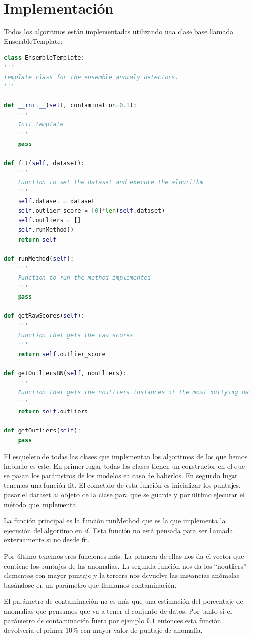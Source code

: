 \section{Implementación}

Todos los algoritmos están implementados utilizando una clase base llamada EnsembleTemplate:

\begin{lstlisting}[language=Python]
class EnsembleTemplate:
'''
Template class for the ensemble anomaly detectors.
'''

def __init__(self, contamination=0.1):
	'''
	Init template
	'''
	pass

def fit(self, dataset):
	'''
	Function to set the dataset and execute the algorithm
	'''
	self.dataset = dataset
	self.outlier_score = [0]*len(self.dataset)
	self.outliers = []
	self.runMethod()
	return self

def runMethod(self):
	'''
	Function to run the method implemented
	'''
	pass

def getRawScores(self):
	'''
	Function that gets the raw scores
	'''
	return self.outlier_score

def getOutliersBN(self, noutliers):
	'''
	Function that gets the noutliers instances of the most outlying data
	'''
	return self.outliers

def getOutliers(self):
	pass
\end{lstlisting}

El esqueleto de todas las clases que implementan los algoritmos de los que hemos hablado es este. En primer lugar todas las clases tienen un constructor en el que se pasan los parámetros de los modelos en caso de haberlos. En segundo lugar tenemos una función fit. El cometido de esta función es inicializar los puntajes, pasar el dataset al objeto de la clase para que se guarde y por último ejecutar el método que implementa.

La función principal es la función runMethod que es la que implementa la ejecución del algoritmo en sí. Esta función no está pensada para ser llamada externamente si no desde fit. 

Por último tenemos tres funciones más. La primera de ellas nos da el vector que contiene los puntajes de las anomalías. La segunda función nos da los ``noutliers'' elementos con mayor puntaje y la tercera nos devuelve las instancias anómalas basándose en un parámetro que llamamos contaminación. 

El parámetro de contaminación no es más que una estimación del porcentaje de anomalías que pensamos que va a tener el conjunto de datos. Por tanto si el parámetro de contaminación fuera por ejemplo $0.1$ entonces esta función devolvería el primer $10\%$ con mayor valor de puntaje de anomalía.